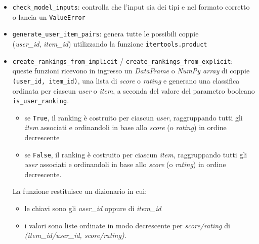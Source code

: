 \begin{itemize}
    
    \item \texttt{check\_model\_inputs}: controlla che l'input sia dei tipi e nel formato corretto o lancia un \texttt{ValueError}
    \item \texttt{generate\_user\_item\_pairs}: genera tutte le possibili coppie \\ (\textit{user\_id}, \textit{item\_id}) utilizzando la funzione \texttt{itertools.product}
    \item \texttt{create\_rankings\_from\_implicit} / \texttt{create\_rankings\_from\_explicit}: \\ queste funzioni ricevono in ingresso un \textit{DataFrame} o \textit{NumPy array} di coppie \texttt{(user\_id, item\_id)}, una lista di \textit{score} o \textit{rating} e generano una classifica ordinata per ciascun \textit{user} o \textit{item}, a seconda del valore del parametro booleano \texttt{is\_user\_ranking}.
    \begin{itemize}
        \item se \texttt{True}, il ranking è costruito per ciascun \textit{user}, raggruppando tutti gli \textit{item} associati e ordinandoli in base allo \textit{score} (o \textit{rating}) in ordine decrescente
        \item se \texttt{False}, il ranking è costruito per ciascun \textit{item}, raggruppando tutti gli \textit{user} associati e ordinandoli in base allo \textit{score} (o \textit{rating}) in ordine decrescente.
    \end{itemize}
    La funzione restituisce un dizionario in cui:
    \begin{itemize}
        \item le chiavi sono gli \textit{user\_id} oppure di \textit{item\_id}
        \item i valori sono liste ordinate in modo decrescente per \textit{score/rating} di \textit{(item\_id/user\_id, score/rating)}.
    \end{itemize}
\end{itemize}
